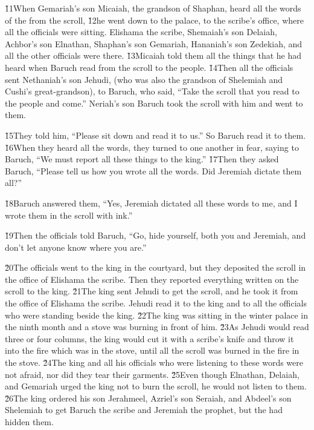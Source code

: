 \v{11}When Gemariah's son Micaiah, the grandson of Shaphan, heard all the words of the  from the scroll, \v{12}he went down to the palace, to the scribe's office, where all the officials were sitting. Elishama the scribe, Shemaiah's son Delaiah, Achbor's son Elnathan, Shaphan's son Gemariah, Hananiah's son Zedekiah, and all the other officials were there. \v{13}Micaiah told them all the things that he had heard when Baruch read from the scroll to the people. \v{14}Then all the officials sent Nethaniah's son Jehudi, (who was also the grandson of Shelemiah and Cushi's great-grandson), to Baruch, who said, ``Take the scroll that you read to the people and come.'' Neriah's son Baruch took the scroll with him and went to them.

\v{15}They told him, ``Please sit down and read it to us.'' So Baruch read it to them. \v{16}When they heard all the words, they turned to one another in fear, saying to Baruch, ``We must report all these things to the king.'' \v{17}Then they asked Baruch, ``Please tell us how you wrote all the words. Did Jeremiah dictate them all?''

\v{18}Baruch answered them, ``Yes, Jeremiah dictated all these words to me, and I wrote them in the scroll with ink.''

\v{19}Then the officials told Baruch, ``Go, hide yourself, both you and Jeremiah, and don't let anyone know where you are.''

\v{20}The officials went to the king in the courtyard, but they deposited the scroll in the office of Elishama the scribe. Then they reported everything written on the scroll to the king. \v{21}The king sent Jehudi to get the scroll, and he took it from the office of Elishama the scribe. Jehudi read it to the king and to all the officials who were standing beside the king. \v{22}The king was sitting in the winter palace in the ninth month and a stove was burning in front of him. \v{23}As Jehudi would read three or four columns, the king would cut it with a scribe's knife and throw it into the fire which was in the stove, until all the scroll was burned in the fire in the stove. \v{24}The king and all his officials who were listening to these words were not afraid, nor did they tear their garments. \v{25}Even though Elnathan, Delaiah, and Gemariah urged the king not to burn the scroll, he would not listen to them. \v{26}The king ordered his son Jerahmeel, Azriel's son Seraiah, and Abdeel's son Shelemiah to get Baruch the scribe and Jeremiah the prophet, but the  had hidden them.

